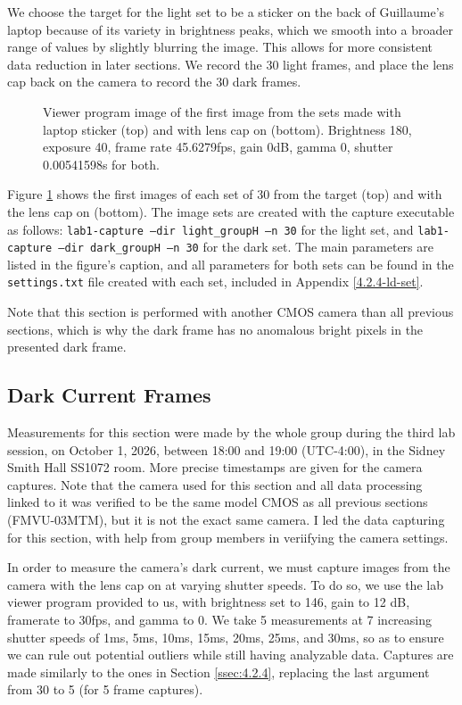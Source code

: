 \documentclass[preprint2]{aastex702}
\begin{document}
			We choose the target for the light set to be a sticker on the back of Guillaume's laptop because of its variety in brightness peaks, which we smooth into a broader range of values by slightly blurring the image. This allows for more consistent data reduction in later sections. We record the 30 light frames, and place the lens cap back on the camera to record the 30 dark frames.

			\begin{figure}
				\caption{Viewer program image of the first image from the sets made with laptop sticker (top) and with lens cap on (bottom). Brightness 180, exposure 40, frame rate 45.6279fps, gain 0dB, gamma 0, shutter 0.00541598s for both.}
				\label{fig:4.2.4-ld}
			\end{figure}

			Figure \ref{fig:4.2.4-ld} shows the first images of each set of 30 from the target (top) and with the lens cap on (bottom). The image sets are created with the capture executable as follows: \texttt{lab1-capture --dir light\_groupH --n 30} for the light set, and \texttt{lab1-capture --dir dark\_groupH --n 30} for the dark set. The main parameters are listed in the figure's caption, and all parameters for both sets can be found in the \texttt{settings.txt} file created with each set, included in Appendix \ref{4.2.4-ld-set}.

			Note that this section is performed with another CMOS camera than all previous sections, which is why the dark frame has no anomalous bright pixels in the presented dark frame. 

		\subsection{Dark Current Frames}\label{ssec:4.2.5}

			Measurements for this section were made by the whole group during the third lab session, on October 1, 2026, between 18:00 and 19:00 (UTC-4:00), in the Sidney Smith Hall SS1072 room. More precise timestamps are given for the camera captures. Note that the camera used for this section and all data processing linked to it was verified to be the same model CMOS as all previous sections (FMVU-03MTM), but it is not the exact same camera. I led the data capturing for this section, with help from group members in veriifying the camera settings.

			In order to measure the camera's dark current, we must capture images from the camera with the lens cap on at varying shutter speeds. To do so, we use the lab viewer program provided to us, with brightness set to 146, gain to 12 dB, framerate to 30fps, and gamma to 0. We take 5 measurements at 7 increasing shutter speeds of 1ms, 5ms, 10ms, 15ms, 20ms, 25ms, and 30ms, so as to ensure we can rule out potential outliers while still having analyzable data. Captures are made similarly to the ones in Section \ref{ssec:4.2.4}, replacing the last argument from 30 to 5 (for 5 frame captures).
\end{document}
